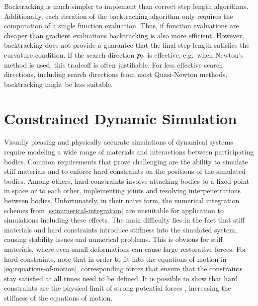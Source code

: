 Backtracking is much simpler to implement than correct step length algorithms. Additionally, each iteration of the backtracking algorithm
only requires the computation of a single function evaluation. Thus, if function evaluations are cheaper than gradient evaluations 
backtracking is also more efficient. However, backtracking does not provide a guarantee that the final step length satisfies the curvature
condition. If the search direction $\bm{p}_k$ is effective, e.g.\ when Newton's method is used, this tradeoff is often justifiable. 
For less effective search directions, including search directions from most Quasi-Newton methods, backtracking might be less suitable.

\section{Constrained Dynamic Simulation}\label{s:dynamic-simulation}
Visually pleasing and physically accurate simulations of dynamical systems require modeling a wide range of materials and 
interactions between participating bodies. Common requirements that prove challenging are the ability to simulate stiff materials
and to enforce hard constraints on the positions of the simulated bodies. Among others, hard constraints involve attaching bodies
to a fixed point in space or to each other, implementing joints and resolving interpenetrations between bodies. Unfortunately, in their 
naive form, the numerical integration schemes from \cref{ss:numerical-integration} are unsuitable for application to simulations 
including these effects. The main difficulty lies in the fact that stiff materials and hard constraints introduce stiffness into 
the simulated system, causing stability issues and numerical problems. This is obvious for stiff materials, where even small 
deformations can cause large restorative forces. For hard constraints, note that in order to fit into the equations of motion in 
\cref{eq:equations-of-motion}, corresponding forces that ensure that the constraints stay satisfied at all times need to be defined. 
It is possible to show that hard constraints are the physical limit of strong potential forces \cite{servin2006}, increasing the 
stiffness of the equations of motion. 

